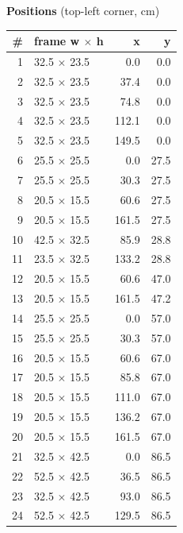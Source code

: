 \documentclass[a4paper,landscape,10pt]{article}
\begin{document}
\begin{minipage}[t]{0.25\textwidth}
\vspace{8pt}
{\bfseries Positions} (top-left corner, cm)\\[2pt]
\tiny
\begin{tabular}{@{}r l r r@{}}
\toprule
\# & frame w $\times$ h & x & y \\
\midrule
1 & 32.5 $\times$ 23.5 & 0.0 & 0.0 \\
2 & 32.5 $\times$ 23.5 & 37.4 & 0.0 \\
3 & 32.5 $\times$ 23.5 & 74.8 & 0.0 \\
4 & 32.5 $\times$ 23.5 & 112.1 & 0.0 \\
5 & 32.5 $\times$ 23.5 & 149.5 & 0.0 \\
6 & 25.5 $\times$ 25.5 & 0.0 & 27.5 \\
7 & 25.5 $\times$ 25.5 & 30.3 & 27.5 \\
8 & 20.5 $\times$ 15.5 & 60.6 & 27.5 \\
9 & 20.5 $\times$ 15.5 & 161.5 & 27.5 \\
10 & 42.5 $\times$ 32.5 & 85.9 & 28.8 \\
11 & 23.5 $\times$ 32.5 & 133.2 & 28.8 \\
12 & 20.5 $\times$ 15.5 & 60.6 & 47.0 \\
13 & 20.5 $\times$ 15.5 & 161.5 & 47.2 \\
14 & 25.5 $\times$ 25.5 & 0.0 & 57.0 \\
15 & 25.5 $\times$ 25.5 & 30.3 & 57.0 \\
16 & 20.5 $\times$ 15.5 & 60.6 & 67.0 \\
17 & 20.5 $\times$ 15.5 & 85.8 & 67.0 \\
18 & 20.5 $\times$ 15.5 & 111.0 & 67.0 \\
19 & 20.5 $\times$ 15.5 & 136.2 & 67.0 \\
20 & 20.5 $\times$ 15.5 & 161.5 & 67.0 \\
21 & 32.5 $\times$ 42.5 & 0.0 & 86.5 \\
22 & 52.5 $\times$ 42.5 & 36.5 & 86.5 \\
23 & 32.5 $\times$ 42.5 & 93.0 & 86.5 \\
24 & 52.5 $\times$ 42.5 & 129.5 & 86.5 \\
\bottomrule
\end{tabular}
\end{minipage}
\clearpage
\end{document}

